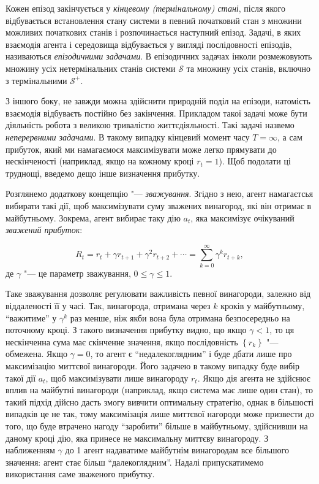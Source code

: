 \documentclass[a4paper,10pt]{article}
\begin{document}
Кожен епізод закінчується у \emph{кінцевому (термінальному) стані}, після якого відбувається встановлення стану системи в певний початковий стан з множини можливих початкових станів і розпочинається наступний епізод. Задачі, в яких взаємодія агента і середовища відбувається у вигляді послідовності епізодів, називаються \emph{епізодичними задачами}. В епізодичних задачах інколи розмежовують множину усіх нетермінальних станів системи $\mathcal{S}$ та множину усіх станів, включно з термінальними $\mathcal{S^+}$.

З іншого боку, не завжди можна здійснити природній поділ на епізоди, натомість взаємодія відбуваєть постійно без закінчення. Прикладом такої задачі може бути діяльність робота з великою тривалістю життєдіяльності. Такі задачі назвемо \emph{неперервними задачами}. В такому випадку кінцевий момент часу $T=\infty$, а сам прибуток, який ми намагаємося максимізувати може легко прямувати до нескінченості (наприклад, якщо на кожному кроці $r_t=1$). Щоб подолати ці труднощі, введемо дещо інше визначення прибутку.

Розглянемо додаткову концепцію "--- \emph{зважування}. Згідно з нею, агент намагаєтсья вибирати такі дії, щоб максимізувати суму зважених винагород, які він отримає в майбутньому. Зокрема, агент вибирає таку дію $a_t$, яка максимізує очікуваний \emph{зважений прибуток}:

\begin{equation}
R_t = r_{t} + \gamma r_{t+1} + \gamma^2 r_{t+2} + \cdots = \sum_{k=0}^{\infty}\gamma^k r_{t+k},
\end{equation}
де $\gamma$ "--- це параметр зважування, $0\leq\gamma\leq 1$.

Таке зважування дозволяє регулювати важливість певної винагороди, залежно від віддаленості її у часі. Так, винагорода, отримана через $k$ кроків у майбутньому, ``важитиме'' у $\gamma^k$ раз менше, ніж якби вона була отримана безпосередньо на поточному кроці. З такого визначення прибутку видно, що якщо $\gamma<1$, то ця нескінченна сума має скінченне значення, якщо послідовність $\left\{r_k\right\}$ "--- обмежена. Якщо $\gamma = 0$, то агент є ``недалекоглядним'' і буде дбати лише про максимізацію миттєвої винагороди. Його задачею в такому випадку буде вибір такої дії $a_t$, щоб максимізувати лише винагороду $r_{t}$. Якщо дія агента не здійснює вплив на майбутні винагороди (наприклад, якщо система має лише один стан), то такий підхід дійсно дасть змогу вивчити оптимальну стратегію, однак в більшості випадків це не так, тому максимізація лише миттєвої нагороди може призвести до того, що буде втрачено нагоду ``заробити'' більше в майбутньому, здійснивши на даному кроці дію, яка принесе не максимальну миттєву винагороду. З наближенням $\gamma$ до 1 агент надаватиме майбутнім винагородам все більшого значення: агент стає більш ``далекоглядним''. Надалі припускатимемо використання саме зваженого прибутку.
\end{document}
